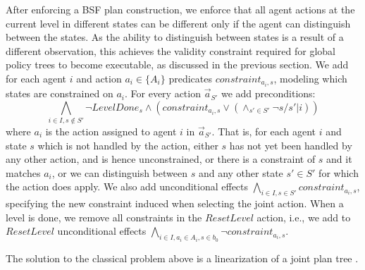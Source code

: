 \documentclass[letterpaper]{article}
\newcommand{\set}[1]{\{#1\}}
\theoremstyle{definition}
\begin{document}
After enforcing a BSF plan construction, we enforce that all agent actions at the current level in different states can be different only if the agent can distinguish between the states. As the ability to distinguish between states is a result of a different observation, this achieves the validity constraint required for global policy trees to become executable, as discussed in the previous section.
We add for each agent $i$ and action $a_i\in \set{A_i}$ predicates $constraint_{a_i,s}$, modeling which states are constrained on $a_i$. For every action $\vec{a}_{S'}$ we add preconditions:
$$\bigwedge_{i \in I,s \notin S'} \neg LevelDone_s \wedge ( constraint_{a_i,s} \vee (\wedge_{s' \in S'} \neg s/s'|i))$$ where $a_i$ is the action assigned to agent $i$ in $\vec{a}_{S'}$. That is, for each agent $i$ and state $s$ which is not handled by the action, either $s$ has not yet been handled by any other action, and is hence unconstrained, or there is a constraint of $s$ and it matches $a_i$, or we can distinguish between $s$ and any other state $s' \in S'$ for which the action does apply. We also add unconditional effects $\bigwedge_{i \in I,s \in S'} constraint_{a_i,s}$, specifying the new constraint induced when selecting the joint action. When a level is done, we remove all constraints in the $ResetLevel$ action, i.e., we add to $ResetLevel$ unconditional effects $\bigwedge_{i \in I, a_i \in A_i, s \in b_0} \neg constraint_{a_i,s}$.

The solution to the classical problem above is a linearization of a joint plan tree \cite{MPSR}.
\end{document}
